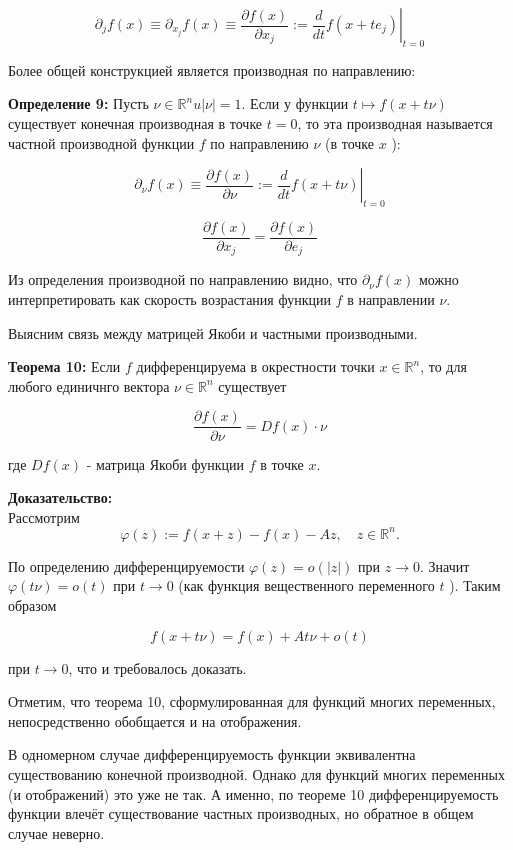 \documentclass[a4paper,12pt]{article} %
\begin{document}
$$
\partial_{j} f(x) \equiv \partial_{x_{j}} f(x) \equiv \frac{\partial f(x)}{\partial x_{j}}:=\left.\frac{d}{d t} f\left(x+t e_{j}\right)\right|_{t=0}
$$

Более общей конструкцией является производная по направлению:

\textbf{Определение 9:} Пусть $\nu \in \mathbb{R}^{n} u|\nu|=1$. Если у функции $t \mapsto f(x+t \nu)$ существует конечная производная в точке $t=0$, то эта производная называется частной производной функции $f$ по направлению $\nu$ (в точке $x$ ):

$$
\partial_{\nu} f(x) \equiv \frac{\partial f(x)}{\partial \nu}:=\left.\frac{d}{d t} f(x+t \nu)\right|_{t=0}
$$


$$
\frac{\partial f(x)}{\partial x_{j}}=\frac{\partial f(x)}{\partial e_{j}}
$$

Из определения производной по направлению видно, что $\partial_{\nu} f(x)$ можно интерпретировать как скорость возрастания функции $f$ в направлении $\nu$.

Выясним связь между матрицей Якоби и частными производными.

\textbf{Теорема 10:} Если $f$ дифференцируема в окрестности точки $x \in \mathbb{R}^{n}$, то для любого единичнго вектора $\nu \in \mathbb{R}^{n}$ существует

$$
\frac{\partial f(x)}{\partial \nu}=D f(x) \cdot \nu
$$

где $D f(x)$ - матрица Якоби функции $f$ в точке $x$.

\textbf{Доказательство:}\\
Рассмотрим
$$
\varphi(z):=f(x+z)-f(x)-A z, \quad z \in \mathbb{R}^{n} .
$$

По определению дифференцируемости $\varphi(z)=o(|z|)$ при $z \rightarrow 0$. Значит $\varphi(t \nu)=o(t)$ при $t \rightarrow 0$ (как функция вещественного переменного $t$ ). Таким образом

$$
f(x+t \nu)=f(x)+A t \nu+o(t)
$$

при $t \rightarrow 0$, что и требовалось доказать.

Отметим, что теорема 10, сформулированная для функций многих переменных, непосредственно обобщается и на отображения.

В одномерном случае дифференцируемость функции эквивалентна существованию конечной производной. Однако для функций многих переменных (и отображений) это уже не так. А именно, по теореме 10 дифференцируемость функции влечёт существование частных производных, но обратное в общем случае неверно.
\end{document}
